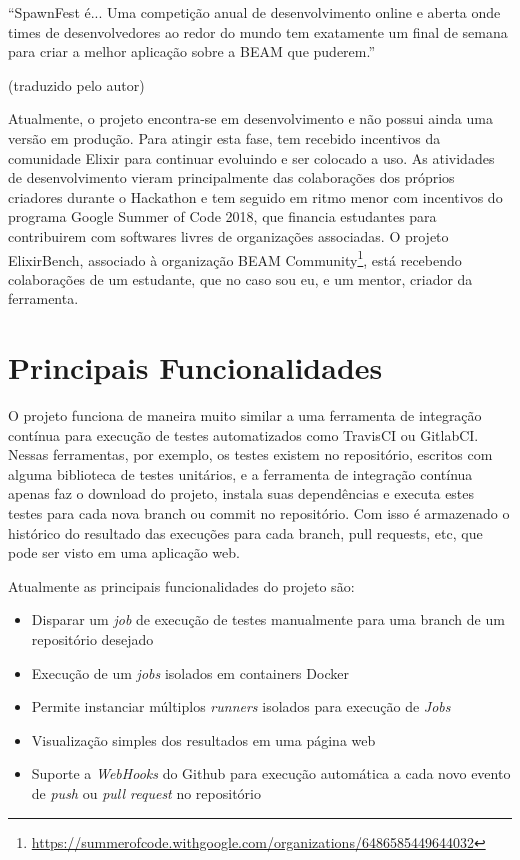  ``SpawnFest é...
 Uma competição anual de desenvolvimento online e aberta onde times de desenvolvedores
 ao redor do mundo tem exatamente um final de semana para criar a melhor aplicação
 sobre a BEAM que puderem.''
 \begin{center}
 (traduzido pelo autor)
 \end{center}

 Atualmente, o projeto encontra-se em desenvolvimento e não possui ainda uma versão em
 produção. Para atingir esta fase, tem recebido incentivos da comunidade
 Elixir para continuar evoluindo e ser colocado a uso. As atividades
 de desenvolvimento vieram principalmente das colaborações dos próprios criadores
 durante o Hackathon e tem seguido em ritmo menor com
 incentivos do programa Google Summer of Code 2018, que financia estudantes para contribuirem
 com softwares livres de organizações associadas. O projeto ElixirBench, 
 associado à organização BEAM Community\footnote{\url{https://summerofcode.withgoogle.com/organizations/6486585449644032}},
 está recebendo colaborações de um estudante, que no caso sou eu, e um
 mentor, criador da ferramenta.
 
\section{Principais Funcionalidades}

 O projeto funciona de maneira muito similar a uma ferramenta de integração
 contínua para execução de testes automatizados como TravisCI ou GitlabCI. Nessas
 ferramentas, por exemplo, os testes existem no repositório, escritos com alguma
 biblioteca de testes unitários, e a ferramenta de integração contínua apenas
 faz o download do projeto, instala suas dependências e executa estes testes
 para cada nova branch ou commit no repositório. Com isso é armazenado o histórico
 do resultado das execuções para cada branch, pull requests, etc, que pode
 ser visto em uma aplicação web.

 Atualmente as principais funcionalidades do projeto são:

 \begin{itemize}
   \item Disparar um \textit{job} de execução de testes manualmente para uma branch de um
   repositório desejado
   \item Execução de um \textit{jobs} isolados em containers Docker
   \item Permite instanciar múltiplos \textit{runners} isolados para execução de \textit{Jobs}
   \item Visualização simples dos resultados em uma página web
   \item Suporte a \textit{WebHooks} do Github para execução automática a cada novo
   evento de \textit{push} ou \textit{pull request} no repositório
 \end{itemize}

